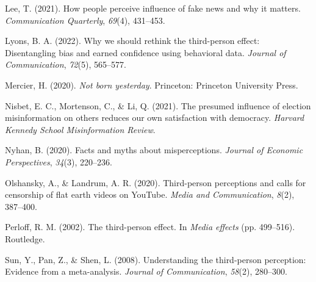 \documentclass[
  ,jou,floatsintext]{apa6}
\newlength{\cslhangindent}
\newlength{\cslentryspacingunit} %
\newenvironment{CSLReferences}[2] %
 {%
  \setlength{\parindent}{0pt}
  \ifodd #1
  \let\oldpar\par
  \def\par{\hangindent=\cslhangindent\oldpar}
  \fi
  \setlength{\parskip}{#2\cslentryspacingunit}
 }%
 {}
\begin{document}
\begin{CSLReferences}{1}{0}
\leavevmode{}%
Lee, T. (2021). How people perceive influence of fake news and why it matters. \emph{Communication Quarterly}, \emph{69}(4), 431--453.

\leavevmode{}%
Lyons, B. A. (2022). Why we should rethink the third-person effect: Disentangling bias and earned confidence using behavioral data. \emph{Journal of Communication}, \emph{72}(5), 565--577.

\leavevmode{}%
Mercier, H. (2020). \emph{Not born yesterday}. Princeton: Princeton University Press.

\leavevmode{}%
Nisbet, E. C., Mortenson, C., \& Li, Q. (2021). The presumed influence of election misinformation on others reduces our own satisfaction with democracy. \emph{Harvard Kennedy School Misinformation Review}.

\leavevmode{}%
Nyhan, B. (2020). Facts and myths about misperceptions. \emph{Journal of Economic Perspectives}, \emph{34}(3), 220--236.

\leavevmode{}%
Olshansky, A., \& Landrum, A. R. (2020). Third-person perceptions and calls for censorship of flat earth videos on YouTube. \emph{Media and Communication}, \emph{8}(2), 387--400.

\leavevmode{}%
Perloff, R. M. (2002). The third-person effect. In \emph{Media effects} (pp. 499--516). Routledge.

\leavevmode{}%
Sun, Y., Pan, Z., \& Shen, L. (2008). Understanding the third-person perception: Evidence from a meta-analysis. \emph{Journal of Communication}, \emph{58}(2), 280--300.

\end{CSLReferences}
\end{document}
